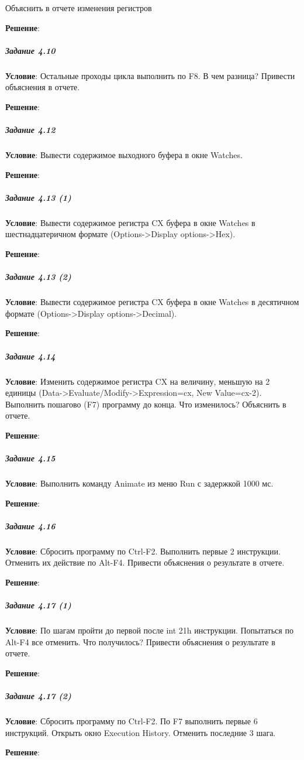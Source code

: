 Объяснить в отчете изменения регистров

\textbf{Решение}:



\subparagraph{Задание 4.10}

\textbf{Условие}:
Остальные проходы цикла выполнить по F8. В чем разница? Привести объяснения в отчете.

\textbf{Решение}:



\subparagraph{Задание 4.12}

\textbf{Условие}: Вывести содержимое выходного буфера в окне Watches. 

\textbf{Решение}:



\subparagraph{Задание 4.13 (1)}

\textbf{Условие}: Вывести содержимое регистра CX буфера в окне Watches в шестнадцатеричном формате (Options->Display options->Hex).

\textbf{Решение}:



\subparagraph{Задание 4.13 (2)}

\textbf{Условие}:
Вывести содержимое регистра CX буфера в окне Watches в десятичном формате (Options->Display options->Decimal).

\textbf{Решение}:



\subparagraph{Задание 4.14}

\textbf{Условие}:
Изменить содержимое регистра CX на величину, меньшую на 2 единицы (Data->Evaluate/Modify->Expression=cx, New Value=cx-2). Выполнить пошагово (F7) программу до конца. Что изменилось? Объяснить в отчете.

\textbf{Решение}:



\subparagraph{Задание 4.15}

\textbf{Условие}:
Выполнить команду Animate из меню Run с задержкой 1000 мс.

\textbf{Решение}:



\subparagraph{Задание 4.16}

\textbf{Условие}:
Сбросить программу по Ctrl-F2. Выполнить первые 2 инструкции. Отменить их действие по Alt-F4. Привести объяснения о результате в отчете.

\textbf{Решение}:



\subparagraph{Задание 4.17 (1)}

\textbf{Условие}:
По шагам пройти до первой после int 21h инструкции. Попытаться по Alt-F4 все отменить. Что получилось? Привести объяснения о результате в отчете.

\textbf{Решение}:



\subparagraph{Задание 4.17 (2)}

\textbf{Условие}:
Сбросить программу по Ctrl-F2. По F7 выполнить первые 6 инструкций. Открыть окно Execution History. Отменить последние 3 шага.

\textbf{Решение}:


